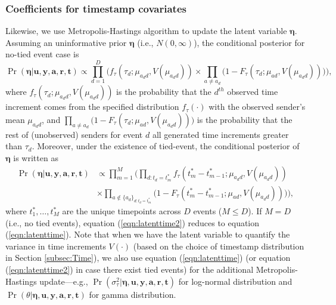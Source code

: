 \documentclass[ba]{imsart}
\numberwithin{equation}{section}
\theoremstyle{plain}
\begin{document}
\subsubsection{Coefficients for timestamp covariates}
Likewise, we use Metropolis-Hastings algorithm to update the latent variable $\boldsymbol{\eta}$. Assuming an uninformative prior $\boldsymbol{\eta}$ (i.e., $N({0},\infty)$), the conditional posterior for no-tied event case is
\begin{equation}
\Pr(\boldsymbol{\eta}| \boldsymbol{u}, \boldsymbol{y},\boldsymbol{a}, \boldsymbol{r},\boldsymbol{t})\propto \prod_{d=1}^D\Big(f_{\tau}(\tau_{d}; \mu_{a_d d}, V(\mu_{a_d d}))\times \prod_{a\neq a_d}\big(1-F_{\tau}(\tau_{d}; \mu_{a d}, V(\mu_{a_d d})) \big)\Big),
\label{eqn:latenttime}
\end{equation}
where $f_{\tau}(\tau_{d}; \mu_{a_d d}, V(\mu_{a_d d}))$ is the probability that the $d^{th}$ observed time increment comes from the specified distribution $f_\tau(\cdot)$ with the observed sender's mean $\mu_{a_d d}$, and $\prod_{a\neq a_d}\big(1-F_{\tau}(\tau_{d}; \mu_{a d},V(\mu_{a_d d})) \big)$ is the probability that the rest of (unobserved) senders for event $d$ all generated time increments greater than $\tau_d$. Moreover, under the existence of tied-event, the conditional posterior of $\boldsymbol{\eta}$ is written as
\begin{equation}
\begin{aligned}
\Pr(\boldsymbol{\eta}| \boldsymbol{u}, \boldsymbol{y},\boldsymbol{a}, \boldsymbol{r},\boldsymbol{t})&\propto \prod_{m=1}^M\Big(\prod_{d:t_d=t_m^*}f_{\tau}(t_m^*-t_{m-1}^*; \mu_{a_d d}, V(\mu_{a_d d})) \\&\times \prod_{a \notin \{a_d\}_{d:t_d=t_m^*}}\big(1-F_{\tau}(t_m^*-t_{m-1}^*; \mu_{a d}, V(\mu_{a_d d})) \big)\Big),
\end{aligned}
\label{eqn:latenttime2}
\end{equation}
where $t_1^*,\ldots,t_M^*$ are the unique timepoints across $D$ events ($M \leq D$). If $M=D$ (i.e., no tied events), equation (\ref{eqn:latenttime2}) reduces to equation (\ref{eqn:latenttime}). Note that when we have the latent variable to quantify the variance in time increments $V(\cdot)$ (based on the choice of timestamp distribution in Section \ref{subsec:Time}), we also use equation (\ref{eqn:latenttime}) (or equation (\ref{eqn:latenttime2}) in case there exist tied events) for the additional Metropolis-Hastings update---e.g., $\Pr(\sigma^2_\tau| \boldsymbol{\eta},\boldsymbol{u}, \boldsymbol{y},\boldsymbol{a}, \boldsymbol{r},\boldsymbol{t})$ for log-normal distribution and $\Pr(\theta| \boldsymbol{\eta},\boldsymbol{u}, \boldsymbol{y},\boldsymbol{a}, \boldsymbol{r},\boldsymbol{t})$ for gamma distribution.
\end{document}
